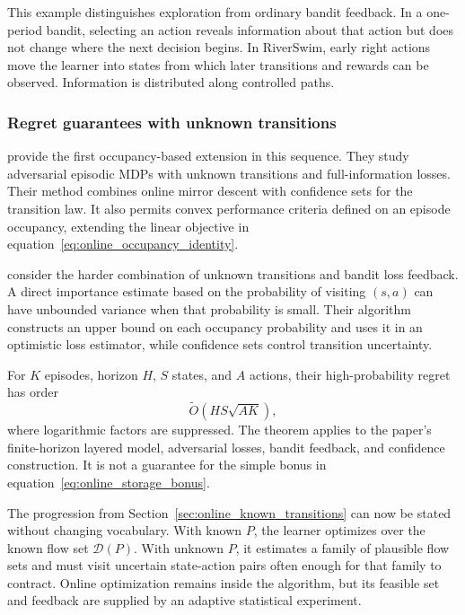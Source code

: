 This example distinguishes exploration from ordinary bandit feedback. In a one-period bandit, selecting an action reveals information about that action but does not change where the next decision begins. In RiverSwim, early right actions move the learner into states from which later transitions and rewards can be observed. Information is distributed along controlled paths.

\subsubsection{Regret guarantees with unknown transitions}

\citet{rosenbergMansour2019} provide the first occupancy-based extension in this sequence. They study adversarial episodic MDPs with unknown transitions and full-information losses. Their method combines online mirror descent with confidence sets for the transition law. It also permits convex performance criteria defined on an episode occupancy, extending the linear objective in equation~\eqref{eq:online_occupancy_identity}.

\citet{jinEtAl2020adversarial} consider the harder combination of unknown transitions and bandit loss feedback. A direct importance estimate based on the probability of visiting $(s,a)$ can have unbounded variance when that probability is small. Their algorithm constructs an upper bound on each occupancy probability and uses it in an optimistic loss estimator, while confidence sets control transition uncertainty.

For $K$ episodes, horizon $H$, $S$ states, and $A$ actions, their high-probability regret has order
\begin{equation}
\widetilde O\!\left(
HS\sqrt{AK}
\right),
\label{eq:online_jin_unknown_bound}
\end{equation}
where logarithmic factors are suppressed. The theorem applies to the paper's finite-horizon layered model, adversarial losses, bandit feedback, and confidence construction. It is not a guarantee for the simple bonus in equation~\eqref{eq:online_storage_bonus}.

The progression from Section~\ref{sec:online_known_transitions} can now be stated without changing vocabulary. With known $P$, the learner optimizes over the known flow set $\mathcal D(P)$. With unknown $P$, it estimates a family of plausible flow sets and must visit uncertain state-action pairs often enough for that family to contract. Online optimization remains inside the algorithm, but its feasible set and feedback are supplied by an adaptive statistical experiment.

